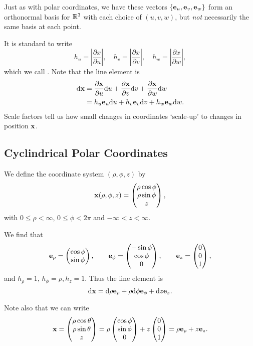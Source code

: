 \documentclass[a4paper]{scrreprt}
\begin{document}
Just as with polar coordinates, we have these vectors $\{\mathbf{e}_u, \mathbf{e}_v, \mathbf{e}_w\}$ form an orthonormal basis for $\mathbb{R}^3$ with each choice of $(u, v, w)$, but \emph{not} necessarily the same basis at each point.

It is standard to write
$$
h_u = \left|\frac{\partial x}{\partial u}\right|,
\quad h_v = \left|\frac{\partial x}{\partial v}\right|,
\quad h_w = \left|\frac{\partial x}{\partial w}\right|,
$$
which we call . Note that the line element is
\begin{align*}
	\mathrm{d} \mathbf{x} &= \frac{\partial \mathbf{x}}{\partial u} \mathrm{d} u
	+ \frac{\partial \mathbf{x}}{\partial v} \mathrm{d} v
	+ \frac{\partial \mathbf{x}}{\partial w} \mathrm{d} w \\
	&= h_u \mathbf{e}_u \mathrm{d} u  + h_v \mathbf{e}_v \mathrm{d} v  + h_w \mathbf{e}_w \mathrm{d} w.
\end{align*}
Scale factors tell us how small changes in coordinates `scale-up' to changes in position $\mathbf{x}$.

\subsection{Cyclindrical Polar Coordinates}

We define the coordinate system $(\rho, \phi, z)$ by
$$
\mathbf{x}(\rho, \phi, z) = \begin{pmatrix}
	\rho \cos \phi \\
	\rho \sin \phi \\
	z
\end{pmatrix},
$$
with $0 \leq \rho < \infty$, $0 \leq \phi < 2 \pi$ and $- \infty < z < \infty$.

We find that
$$
\mathbf{e}_{\rho} = \begin{pmatrix}
	\cos \phi \\
	\sin \phi
\end{pmatrix}, \quad \quad \mathbf{e}_{\phi} = \begin{pmatrix}
	-\sin \phi \\
	\cos \phi \\
	0
\end{pmatrix}, \quad \quad \mathbf{e}_z = \begin{pmatrix}
	0 \\ 0 \\ 1
\end{pmatrix},
$$
and $h_\rho = 1$, $h_{\phi} = \rho, h_z = 1$. Thus the line element is
$$
\mathrm{d} \mathbf{x} = \mathrm{d} \rho \mathbf{e}_\rho + \rho \mathrm{d} \phi \mathbf{e}_\phi
 + \mathrm{d} z \mathbf{e}_z.
 $$

 Note also that we can write
 $$
\mathbf{x} = \begin{pmatrix}
	\rho \cos \theta \\ \rho \sin \theta \\ z
\end{pmatrix} = \rho \begin{pmatrix}
	\cos \phi \\
	\sin \phi \\
	 0
\end{pmatrix} + z \begin{pmatrix}
	0 \\ 0 \\ 1\end{pmatrix} = \rho \mathbf{e}_\rho + z \mathbf{e}_z.
 $$
\end{document}
